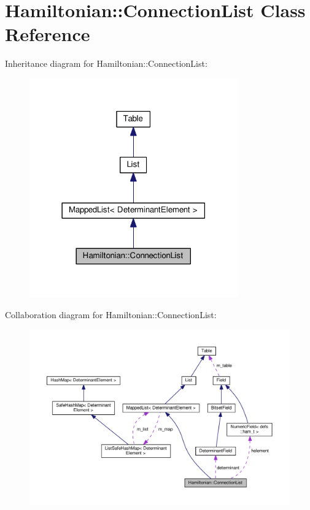 \hypertarget{classHamiltonian_1_1ConnectionList}{}\section{Hamiltonian\+:\+:Connection\+List Class Reference}
\label{classHamiltonian_1_1ConnectionList}


Inheritance diagram for Hamiltonian\+:\+:Connection\+List\+:
\nopagebreak
\begin{figure}[H]
\begin{center}
\leavevmode
\includegraphics[width=254pt]{classHamiltonian_1_1ConnectionList__inherit__graph}
\end{center}
\end{figure}


Collaboration diagram for Hamiltonian\+:\+:Connection\+List\+:
\nopagebreak
\begin{figure}[H]
\begin{center}
\leavevmode
\includegraphics[width=350pt]{classHamiltonian_1_1ConnectionList__coll__graph}
\end{center}
\end{figure}
